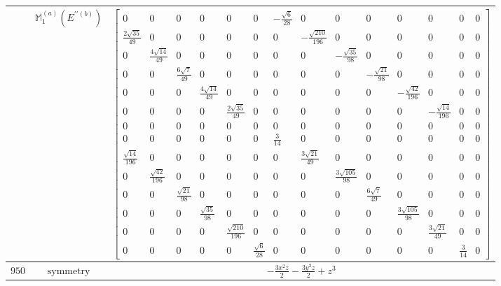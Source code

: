 \documentclass[fleqn,8pt,landscape]{jsarticle}
\begin{document}
\begin{longtable}{ccc}
$  $ & $ \mathbb{M}_{1}^{(a)}(E^{\prime\prime(b)}) $ & $ \begin{bmatrix} 0 & 0 & 0 & 0 & 0 & 0 & - \frac{\sqrt{6}}{28} & 0 & 0 & 0 & 0 & 0 & 0 & 0 \\ \frac{2 \sqrt{35}}{49} & 0 & 0 & 0 & 0 & 0 & 0 & - \frac{\sqrt{210}}{196} & 0 & 0 & 0 & 0 & 0 & 0 \\ 0 & \frac{4 \sqrt{14}}{49} & 0 & 0 & 0 & 0 & 0 & 0 & - \frac{\sqrt{35}}{98} & 0 & 0 & 0 & 0 & 0 \\ 0 & 0 & \frac{6 \sqrt{7}}{49} & 0 & 0 & 0 & 0 & 0 & 0 & - \frac{\sqrt{21}}{98} & 0 & 0 & 0 & 0 \\ 0 & 0 & 0 & \frac{4 \sqrt{14}}{49} & 0 & 0 & 0 & 0 & 0 & 0 & - \frac{\sqrt{42}}{196} & 0 & 0 & 0 \\ 0 & 0 & 0 & 0 & \frac{2 \sqrt{35}}{49} & 0 & 0 & 0 & 0 & 0 & 0 & - \frac{\sqrt{14}}{196} & 0 & 0 \\ 0 & 0 & 0 & 0 & 0 & 0 & 0 & 0 & 0 & 0 & 0 & 0 & 0 & 0 \\ 0 & 0 & 0 & 0 & 0 & 0 & \frac{3}{14} & 0 & 0 & 0 & 0 & 0 & 0 & 0 \\ \frac{\sqrt{14}}{196} & 0 & 0 & 0 & 0 & 0 & 0 & \frac{3 \sqrt{21}}{49} & 0 & 0 & 0 & 0 & 0 & 0 \\ 0 & \frac{\sqrt{42}}{196} & 0 & 0 & 0 & 0 & 0 & 0 & \frac{3 \sqrt{105}}{98} & 0 & 0 & 0 & 0 & 0 \\ 0 & 0 & \frac{\sqrt{21}}{98} & 0 & 0 & 0 & 0 & 0 & 0 & \frac{6 \sqrt{7}}{49} & 0 & 0 & 0 & 0 \\ 0 & 0 & 0 & \frac{\sqrt{35}}{98} & 0 & 0 & 0 & 0 & 0 & 0 & \frac{3 \sqrt{105}}{98} & 0 & 0 & 0 \\ 0 & 0 & 0 & 0 & \frac{\sqrt{210}}{196} & 0 & 0 & 0 & 0 & 0 & 0 & \frac{3 \sqrt{21}}{49} & 0 & 0 \\ 0 & 0 & 0 & 0 & 0 & \frac{\sqrt{6}}{28} & 0 & 0 & 0 & 0 & 0 & 0 & \frac{3}{14} & 0 \end{bmatrix} $ \\ \hline
$ 950 $ & $ \text{symmetry} $ & $ - \frac{3 x^{2} z}{2} - \frac{3 y^{2} z}{2} + z^{3} $ \\

\end{longtable}
\end{document}
